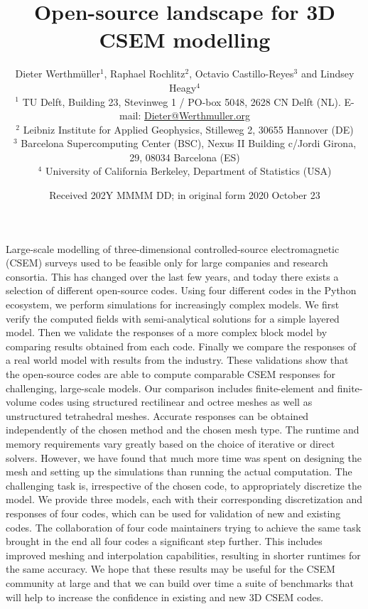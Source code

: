 \documentclass[onecolumn,extra,camera]{gji}
\title[3D CSEM Open-Source Landscape]{Open-source landscape for 3D CSEM modelling}
\author[D. Werthmüller \emph{et al.}]
  {\Large Dieter Werthmüller$^1$,        %
   Raphael Rochlitz$^2$,          %
   Octavio Castillo-Reyes$^3$ and %
   Lindsey Heagy$^4$              %
   \\
   \footnotesize
  $^1$ TU Delft, Building 23, Stevinweg 1 / PO-box 5048, 2628 CN Delft (NL).
  E-mail: \href{mailto:Dieter@Werthmuller.org}{Dieter@Werthmuller.org}\\[-.3em]
   \footnotesize
  $^2$ Leibniz Institute for Applied Geophysics, Stilleweg 2, 30655 Hannover (DE)\\[-.3em]
   \footnotesize
   $^3$ Barcelona Supercomputing Center (BSC), Nexus II Building c/Jordi Girona, 29, 08034 Barcelona (ES)\\[-.3em]
   \footnotesize
  $^4$ University of California Berkeley, Department of Statistics (USA)
  }
\date{Received 202Y MMMM DD; in original form 2020 October 23}
\makeatletter
\let\zz@tabular\@tabular
\let\zzendtabular\endtabular
\let\zz@xtabularcr\@xtabularcr
\let\zz@tabclassz\@tabclassz
\let\zz@tabclassiv \@tabclassiv
\let\zz@tabarray\@tabarray
\makeatother
\begin{document}
\label{firstpage}

{\makeatletter
\let\@tabular\zz@tabular
\let\endtabular\zzendtabular
\let\@xtabularcr\zz@xtabularcr
\let\@tabclassz\zz@tabclassz
\let\@tabclassiv \zz@tabclassiv 
\let\@tabarray\zz@tabarray
\maketitle
}

\begin{summary}
Large-scale modelling of three-dimensional controlled-source electromagnetic (CSEM) surveys used to be feasible only for large companies and research consortia. This has changed over the last few years, and today there exists a selection of different open-source codes. Using four different codes in the Python ecosystem, we perform simulations for increasingly complex models. We first verify the computed fields with semi-analytical solutions for a simple layered model. Then we validate the responses of a more complex block model by comparing results obtained from each code. Finally we compare the responses of a real world model with results from the industry. These validations show that the open-source codes are able to compute comparable CSEM responses for challenging, large-scale models. Our comparison includes finite-element and finite-volume codes using structured rectilinear and octree meshes as well as unstructured tetrahedral meshes. Accurate responses can be obtained independently of the chosen method and the chosen mesh type. The runtime and memory requirements vary greatly based on the choice of iterative or direct solvers. However, we have found that much more time was spent on designing the mesh and setting up the simulations than running the actual computation. The challenging task is, irrespective of the chosen code, to appropriately discretize the model. We provide three models, each with their corresponding discretization and responses of four codes, which can be used for validation of new and existing codes. The collaboration of four code maintainers trying to achieve the same task brought in the end all four codes a significant step further. This includes improved meshing and interpolation capabilities, resulting in shorter runtimes for the same accuracy. We hope that these results may be useful for the CSEM community at large and that we can build over time a suite of benchmarks that will help to increase the confidence in existing and new 3D CSEM codes.
\end{summary}
\end{document}

